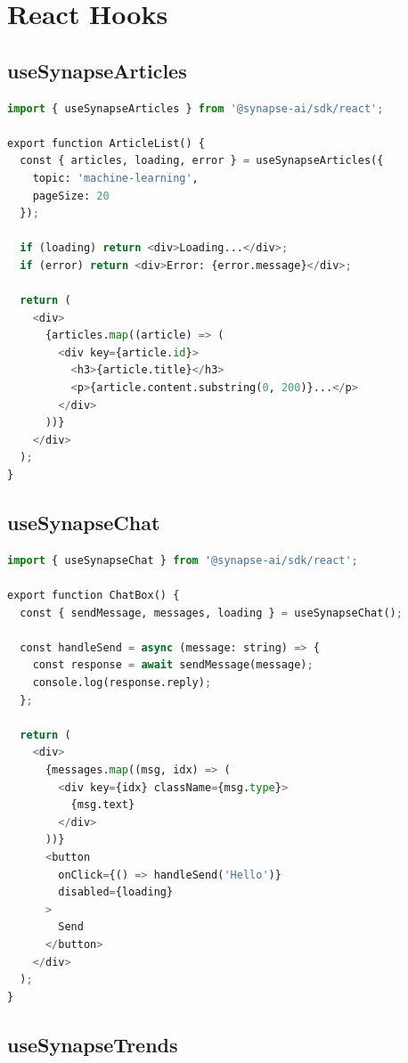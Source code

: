 \documentclass{report}
\begin{document}
\section{React Hooks}

\subsection{useSynapseArticles}

\begin{lstlisting}[language=Python]
import { useSynapseArticles } from '@synapse-ai/sdk/react';

export function ArticleList() {
  const { articles, loading, error } = useSynapseArticles({
    topic: 'machine-learning',
    pageSize: 20
  });

  if (loading) return <div>Loading...</div>;
  if (error) return <div>Error: {error.message}</div>;

  return (
    <div>
      {articles.map((article) => (
        <div key={article.id}>
          <h3>{article.title}</h3>
          <p>{article.content.substring(0, 200)}...</p>
        </div>
      ))}
    </div>
  );
}
\end{lstlisting}

\subsection{useSynapseChat}

\begin{lstlisting}[language=Python]
import { useSynapseChat } from '@synapse-ai/sdk/react';

export function ChatBox() {
  const { sendMessage, messages, loading } = useSynapseChat();

  const handleSend = async (message: string) => {
    const response = await sendMessage(message);
    console.log(response.reply);
  };

  return (
    <div>
      {messages.map((msg, idx) => (
        <div key={idx} className={msg.type}>
          {msg.text}
        </div>
      ))}
      <button 
        onClick={() => handleSend('Hello')}
        disabled={loading}
      >
        Send
      </button>
    </div>
  );
}
\end{lstlisting}

\subsection{useSynapseTrends}
\end{document}
